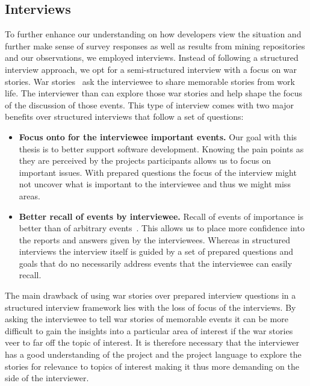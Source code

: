 \subsection{Interviews}
To further enhance our understanding on how developers view the situation and further make sense of survey responses as well as results from mining repositories and our observations, we employed interviews.
Instead of following a structured interview approach, we opt for a semi-structured interview with a focus on war stories.
War stories~\cite{lutters:ist:2007} ask the interviewee to share memorable stories from work life.
The interviewer than can explore those war stories and help shape the focus of the discussion of those events.
This type of interview comes with two major benefits over structured interviews that follow a set of questions:

\begin{itemize}
\item\textbf{Focus onto for the interviewee important events.}
Our goal with this thesis is to better support software development.
Knowing the pain points as they are perceived by the projects participants allows us to focus on important issues.
With prepared questions the focus of the interview might not uncover what is important to the interviewee and thus we might miss areas.
\item\textbf{Better recall of events by interviewee.}
Recall of events of importance is better than of arbitrary events~\cite{lutters:ist:2007}.
This allows us to place more confidence into the reports and answers given by the interviewees.
Whereas in structured interviews the interview itself is guided by a set of prepared questions and goals that do no necessarily address events that the interviewee can easily recall.
\end{itemize}

The main drawback of using war stories over prepared interview questions in a structured interview framework lies with the loss of focus of the interviews.
By asking the interviewee to tell war stories of memorable events it can be more difficult to gain the insights into a particular area of interest if the war stories veer to far off the topic of interest.
It is therefore necessary that the interviewer has a good understanding of the project and the project language to explore the stories for relevance to topics of interest making it thus more demanding on the side of the interviewer.

